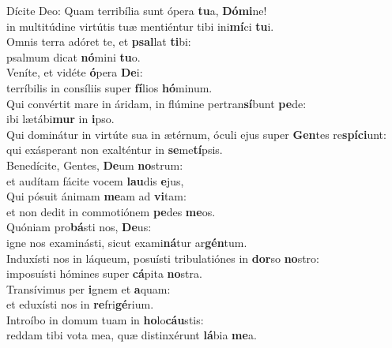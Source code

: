\evenverse Dícite Deo: Quam terribília sunt ópera \textbf{tu}a, \textbf{Dó}\textbf{mi}ne!~\*\\
\evenverse in multitúdine virtútis tuæ mentiéntur tibi ini\textbf{mí}ci \textbf{tu}i.\\
\oddverse Omnis terra adóret te, et \textbf{psal}lat \textbf{ti}bi:~\*\\
\oddverse psalmum dicat \textbf{nó}mini \textbf{tu}o.\\
\evenverse Veníte, et vidéte \textbf{ó}pera \textbf{De}i:~\*\\
\evenverse terríbilis in consíliis super \textbf{fí}lios \textbf{hó}minum.\\
\oddverse Qui convértit mare in áridam, in flúmine pertran\textbf{sí}bunt \textbf{pe}de:~\*\\
\oddverse ibi lætábi\textbf{mur} in \textbf{i}pso.\\
\evenverse Qui dominátur in virtúte sua in ætérnum, óculi ejus super \textbf{Gen}tes re\textbf{spí}\textbf{ci}unt:~\*\\
\evenverse qui exásperant non exalténtur in \textbf{se}me\textbf{tí}psis.\\
\oddverse Benedícite, Gentes, \textbf{De}um \textbf{no}strum:~\*\\
\oddverse et audítam fácite vocem \textbf{lau}dis \textbf{e}jus,\\
\evenverse Qui pósuit ánimam \textbf{me}am ad \textbf{vi}tam:~\*\\
\evenverse et non dedit in commotiónem \textbf{pe}des \textbf{me}os.\\
\oddverse Quóniam pro\textbf{bá}sti nos, \textbf{De}us:~\*\\
\oddverse igne nos examinásti, sicut exami\textbf{ná}tur ar\textbf{gén}tum.\\
\evenverse Induxísti nos in láqueum, posuísti tribulatiónes in \textbf{dor}so \textbf{no}stro:~\*\\
\evenverse imposuísti hómines super \textbf{cá}pita \textbf{no}stra.\\
\oddverse Transívimus per \textbf{i}gnem et \textbf{a}quam:~\*\\
\oddverse et eduxísti nos in \textbf{re}fri\textbf{gé}rium.\\
\evenverse Introíbo in domum tuam in \textbf{ho}lo\textbf{cáu}stis:~\*\\
\evenverse reddam tibi vota mea, quæ distinxérunt \textbf{lá}bia \textbf{me}a.\\
